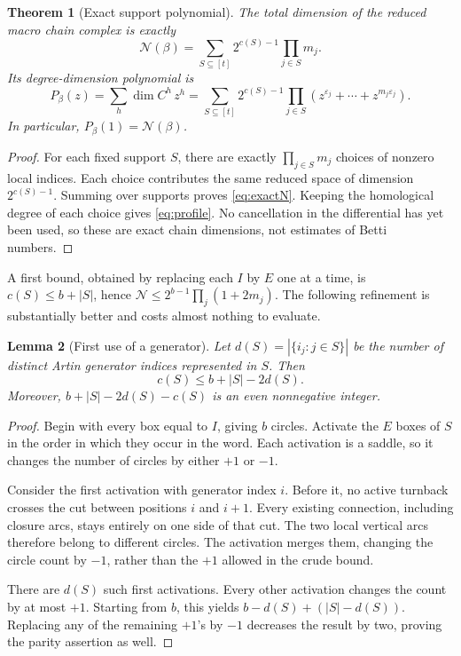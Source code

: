 \documentclass[11pt,letterpaper]{article}
\newtheorem{theorem}{Theorem}[section]
\newtheorem{lemma}[theorem]{Lemma}
\theoremstyle{definition}
\newcommand{\N}{\mathcal N}
\newcommand{\eps}{\varepsilon}
\begin{document}
\begin{theorem}[Exact support polynomial]\label{thm:polynomial}
The total dimension of the reduced macro chain complex is exactly
\begin{equation}\label{eq:exactN}
 \N(\beta)=\sum_{S\subseteq[t]}2^{c(S)-1}\prod_{j\in S}m_j.
\end{equation}
Its degree-dimension polynomial is
\begin{equation}\label{eq:profile}
 P_\beta(z)=\sum_h\dim C^h\,z^h
 =\sum_{S\subseteq[t]}2^{c(S)-1}
        \prod_{j\in S}(z^{\eps_j}+\cdots+z^{m_j\eps_j}).
\end{equation}
In particular, \(P_\beta(1)=\N(\beta)\).
\end{theorem}
\begin{proof}
For each fixed support \(S\), there are exactly \(\prod_{j\in S}m_j\) choices of nonzero local indices. Each choice contributes the same reduced space of dimension \(2^{c(S)-1}\). Summing over supports proves \cref{eq:exactN}. Keeping the homological degree of each choice gives \cref{eq:profile}. No cancellation in the differential has yet been used, so these are exact chain dimensions, not estimates of Betti numbers.
\end{proof}

A first bound, obtained by replacing each \(I\) by \(E\) one at a time, is
\(c(S)\leq b+|S|\), hence
\(\N\leq2^{b-1}\prod_j(1+2m_j)\).
The following refinement is substantially better and costs almost nothing to evaluate.

\begin{lemma}[First use of a generator]\label{lem:first}
Let
\(d(S)=|\{i_j:j\in S\}|\) be the number of distinct Artin generator indices represented in \(S\). Then
\begin{equation}\label{eq:first}
 c(S)\leq b+|S|-2d(S).
\end{equation}
Moreover, \(b+|S|-2d(S)-c(S)\) is an even nonnegative integer.
\end{lemma}
\begin{proof}
Begin with every box equal to \(I\), giving \(b\) circles. Activate the \(E\) boxes of \(S\) in the order in which they occur in the word. Each activation is a saddle, so it changes the number of circles by either \(+1\) or \(-1\).

Consider the first activation with generator index \(i\). Before it, no active turnback crosses the cut between positions \(i\) and \(i+1\). Every existing connection, including closure arcs, stays entirely on one side of that cut. The two local vertical arcs therefore belong to different circles. The activation merges them, changing the circle count by \(-1\), rather than the \(+1\) allowed in the crude bound.

There are \(d(S)\) such first activations. Every other activation changes the count by at most \(+1\). Starting from \(b\), this yields
\(b-d(S)+(|S|-d(S))\). Replacing any of the remaining \(+1\)'s by \(-1\) decreases the result by two, proving the parity assertion as well.
\end{proof}
\end{document}
